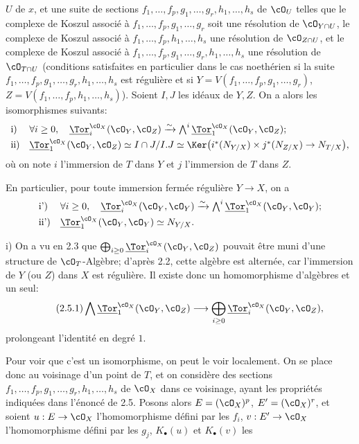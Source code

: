 \(U\) de \(x\), et une suite de sections \(f_1,\ldots,f_p,g_1,\ldots,g_r,h_1,\ldots,h_s\) de \(\cO_U\) telles que le complexe de Koszul associé à \(f_1,\ldots,f_p,g_1,\ldots,g_r\) soit une résolution de \(\cO_{Y\cap U}\), le complexe de Koszul associé à \(f_1,\ldots,f_p,h_1,\ldots,h_s\) une résolution de \(\cO_{Z\cap U}\), et le complexe de Koszul associé à \(f_1,\ldots,f_p,g_1,\ldots,g_r,h_1,\ldots,h_s\) une résolution de \(\cO_{T\cap U}\) (conditions satisfaites en particulier dans le cas noethérien si la suite \(f_1,\ldots,f_p,g_1,\ldots,g_r,h_1,\ldots,h_s\) est régulière et si \(Y=V(f_1,\ldots,f_p,g_1,\ldots,g_r)\), \(Z=V(f_1,\ldots,f_p,h_1,\ldots,h_s)\)). Soient \(I,J\) les idéaux de \(Y,Z\). On a alors les isomorphismes suivants:
\[
\begin{array}{ll}
\text{i)}& \forall i\ge0,\quad
\underline{\Tor}_i^{\cO_X}(\cO_Y,\cO_Z)\xrightarrow{\sim}
\bigwedge^i\underline{\Tor}_1^{\cO_X}(\cO_Y,\cO_Z);\\[0.8ex]
\text{ii)}&
\underline{\Tor}_1^{\cO_X}(\cO_Y,\cO_Z)\simeq
I\cap J/I.J\simeq
\Ker\bigl(i^*(N_{Y/X})\times j^*(N_{Z/X})\to N_{T/X}\bigr),
\end{array}
\]
où on note \(i\) l'immersion de \(T\) dans \(Y\) et \(j\) l'immersion de \(T\) dans \(Z\).

En particulier, pour toute immersion fermée régulière \(Y\to X\), on a
\[
\begin{array}{ll}
\text{i')}& \forall i\ge0,\quad
\underline{\Tor}_i^{\cO_X}(\cO_Y,\cO_Y)\xrightarrow{\sim}
\bigwedge^i\underline{\Tor}_1^{\cO_X}(\cO_Y,\cO_Y);\\[0.8ex]
\text{ii')}&
\underline{\Tor}_1^{\cO_X}(\cO_Y,\cO_Y)\simeq N_{Y/X}.
\end{array}
\]

i) On a vu en 2.3 que \(\bigoplus_{i\ge0}\underline{\Tor}_i^{\cO_X}(\cO_Y,\cO_Z)\) pouvait être muni d'une structure de \(\cO_T\)-Algèbre; d'après 2.2, cette algèbre est alternée, car l'immersion de \(Y\) (ou \(Z\)) dans \(X\) est régulière. Il existe donc un homomorphisme d'algèbres et un seul:
\begin{equation}\tag{2.5.1}
\bigwedge \underline{\Tor}_1^{\cO_X}(\cO_Y,\cO_Z)\longrightarrow
\bigoplus_{i\ge0}\underline{\Tor}_i^{\cO_X}(\cO_Y,\cO_Z),
\end{equation}
prolongeant l'identité en degré \(1\).

Pour voir que c'est un isomorphisme, on peut le voir localement. On se place donc au voisinage d'un point de \(T\), et on considère des sections \(f_1,\ldots,f_p,g_1,\ldots,g_r,h_1,\ldots,h_s\) de \(\cO_X\) dans ce voisinage, ayant les propriétés indiquées dans l'énoncé de 2.5. Posons alors \(E=(\cO_X)^p\), \(E'=(\cO_X)^r\), et soient \(u:E\to\cO_X\) l'homomorphisme défini par les \(f_i\), \(v:E'\to\cO_X\) l'homomorphisme défini par les \(g_j\), \(K_\bullet(u)\) et \(K_\bullet(v)\) les
